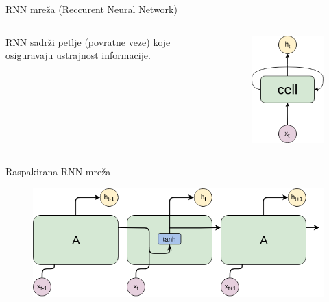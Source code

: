 \documentclass{beamer}
\begin{document}
  \begin{frame}{RNN mreža (Reccurent Neural Network)}
    \begin{columns}
        RNN sadrži petlje (povratne veze) koje osiguravaju ustrajnost informacije.
      \begin{figure}[]
        \centering
        \includegraphics[width=0.6\linewidth]{images/RNN.png}
      \end{figure}
    \end{columns}
  \end{frame}
  \begin{frame}{Raspakirana RNN mreža}
    \begin{figure}[]
      \centering
      \includegraphics[width=\linewidth]{images/RNN-unpacked.png}
    \end{figure}
  \end{frame}
\end{document}
